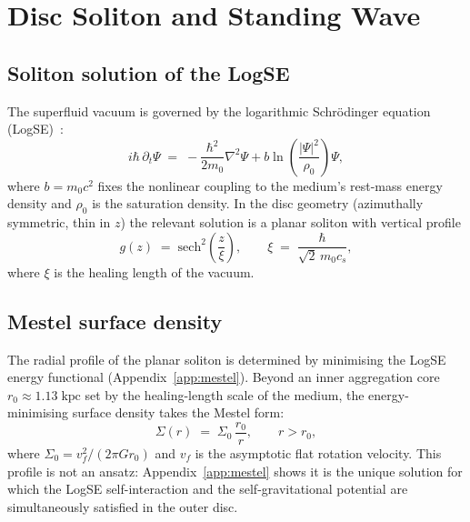 \documentclass[11pt,a4paper]{article}
\begin{document}
\section{Disc Soliton and Standing Wave}
\label{sec:soliton}

\subsection{Soliton solution of the LogSE}

The superfluid vacuum is governed by the logarithmic Schr\"odinger equation
(LogSE)~\cite{zloshchastiev2011}:
\begin{equation}
  i\hbar\,\partial_t\Psi \;=\;
  -\frac{\hbar^2}{2m_0}\nabla^2\Psi
  + b\ln\!\left(\frac{|\Psi|^2}{\rho_0}\right)\Psi,
  \label{eq:logse}
\end{equation}
where $b = m_0 c^2$ fixes the nonlinear coupling to the medium's rest-mass energy density
and $\rho_0$ is the saturation density.  In the disc geometry (azimuthally symmetric, thin
in $z$) the relevant solution is a planar soliton with vertical profile
\begin{equation}
  g(z) \;=\; \mathrm{sech}^2\!\left(\frac{z}{\xi}\right),
  \qquad \xi \;=\; \frac{\hbar}{\sqrt{2}\,m_0 c_s},
  \label{eq:vertical}
\end{equation}
where $\xi$ is the healing length of the vacuum.

\subsection{Mestel surface density}

The radial profile of the planar soliton is determined by minimising the LogSE energy
functional (Appendix~\ref{app:mestel}).  Beyond an inner aggregation core
$r_0 \approx 1.13\;\mathrm{kpc}$ set by the healing-length scale of the medium, the
energy-minimising surface density takes the Mestel form:
\begin{equation}
  \boxed{\Sigma(r) \;=\; \Sigma_0\,\frac{r_0}{r}, \qquad r > r_0,}
  \label{eq:mestel}
\end{equation}
where $\Sigma_0 = v_f^2/(2\pi G r_0)$ and $v_f$ is the asymptotic flat rotation velocity.
This profile is not an ansatz: Appendix~\ref{app:mestel} shows it is the unique solution for
which the LogSE self-interaction and the self-gravitational potential are simultaneously
satisfied in the outer disc.
\end{document}
